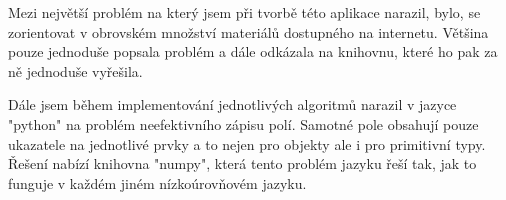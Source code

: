\documentclass[ 12pt, a4paper]{article}
\begin{document}
Mezi největší problém na který jsem při tvorbě této aplikace narazil, bylo, se zorientovat v obrovském množství materiálů dostupného na internetu. Většina pouze jednoduše popsala problém a dále odkázala na knihovnu, které ho pak za ně jednoduše vyřešila. 

Dále jsem během implementování jednotlivých algoritmů narazil v jazyce "python" na problém neefektivního zápisu polí. Samotné pole obsahují pouze ukazatele na jednotlivé prvky a to nejen pro objekty ale i pro primitivní typy. Řešení nabízí knihovna "numpy", která tento problém jazyku řeší tak, jak to funguje v každém jiném nízkoúrovňovém jazyku. 






\newpage
\end{document}
